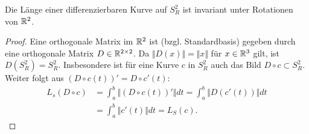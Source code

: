 \begin{lemma}
  \label{lemma:kurvenlaengen}
  Die Länge einer differenzierbaren Kurve auf $ S^2_R $ ist invariant unter Rotationen von $ \mathbb{R}^2 $.
  \begin{proof}
    Eine orthogonale Matrix im $ \mathbb{R}^2 $ ist (bzgl. Standardbasis) gegeben durch eine orthogonale Matrix $ D \in \mathbb{R}^{2 \times 2} $. Da $ \Vert D(x) \Vert = \Vert x \Vert $ für $ x \in \mathbb{R}^3 $ gilt, ist $ D(S^2_R) = S^2_R $. Insbesondere ist für eine Kurve $ c $ in $ S^2_R $ auch das Bild $ D \circ c \subset S^2_R $. \\
    Weiter folgt aus $ (D \circ c(t))' = D \circ c'(t) $:
    \begin{align*}
      L_s(D \circ c) &= \int_a^b \Vert (D \circ c(t))' \Vert dt = \int_a^b \Vert D(c'(t)) \Vert dt \\
        &= \int_a^b \Vert c'(t) \Vert dt = L_S(c)\text{.}
    \end{align*}
  \end{proof}
\end{lemma}

